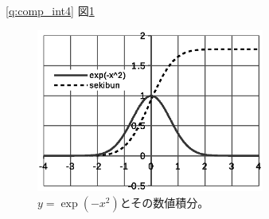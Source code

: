\ref{q:comp_int4}  図\ref{fig:PC_graph_Gauss_integ}
\begin{figure}[!h]
    \centering
    \includegraphics[width=7.5cm]{PC_graph_Gauss_integ.eps}
    \caption{$y=\exp(-x^2)$とその数値積分。\label{fig:PC_graph_Gauss_integ}}
\end{figure}
\vv



